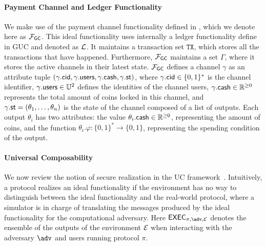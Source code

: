 \paragraph{Payment Channel and Ledger Functionality}
We make use of the payment channel functionality defined in , which we denote here as $\mathcal{F}_{\mathsf{GC}}$. This ideal 
functionality uses internally a ledger functionality define in GUC and denoted as $\mathcal{L}$.
It maintains a transaction set $\mathtt{TX}$, which stores all the transactions that have 
happened. Furthermore, $\mathcal{F}_{\mathsf{GC}}$ maintains a set $\Gamma$, where it stores the active 
channels in their latest state. $\mathcal{F}_{\mathsf{GC}}$ defines a channel $\gamma$ as an attribute tuple 
$(\gamma.\mathsf{cid}, \gamma.\mathsf{users}, \gamma.\mathsf{cash}, \gamma.\mathsf{st})$, where $\gamma.\mathsf{cid} \in \{0,1\}^*$ is 
the channel identifier, $\gamma.\mathsf{users} \in \mathbb{U}^2$ defines the identities of the channel 
users, $\gamma.\mathsf{cash} \in \mathbb{R}^{\geq 0}$ represents the total amount of coins locked in 
this channel, and $\gamma.\mathsf{st} = (\theta_1,\ldots,\theta_n)$ is the state of the channel 
composed of a list of outputs. Each output $\theta_i$ has two attributes: the value $\theta_i.
\mathsf{cash} \in \mathbb{R}^{\geq 0}$, representing the amount of coins, and the function $\theta_i.
\varphi \colon \{0,1\}^* \to \{0,1\}$, representing the spending condition of the output. 


\paragraph{Universal Composability}
We now review the notion of secure realization in the UC framework~\cite{canetti}. 
Intuitively, a protocol realizes an ideal functionality if the environment has no way 
to distinguish between the ideal functionality and the real-world protocol, where 
a simulator is in charge of translating the messages produced by the ideal functionality 
for the computational adversary. Here $\exec_{\pi, \adv, \dist}$ denotes the ensemble of 
the outputs of the environment $\mathcal{E}$ when interacting with the adversary $\adv$ and 
users running protocol $\pi$.

